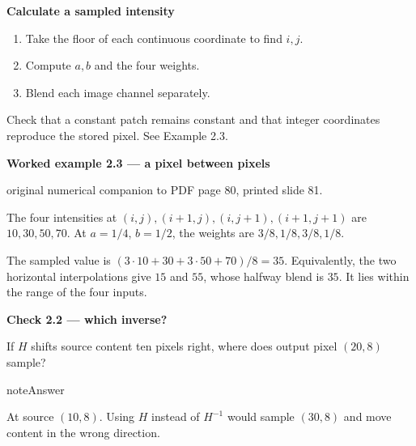 \documentclass[letterpaper,11pt,english,openany,oneside]{jupyterBook}
\begin{document}
\begin{TextbookBox}
\textbf{Calculate a sampled intensity}\par\smallskip
\begin{enumerate}
%
\item {}
\sphinxAtStartPar
Take the floor of each continuous coordinate to find \(i,j\).

\item {}
\sphinxAtStartPar
Compute \(a,b\) and the four weights.

\item {}
\sphinxAtStartPar
Blend each image channel separately.

\end{enumerate}

\sphinxAtStartPar
Check that a constant patch remains constant and that integer coordinates reproduce the stored pixel. See Example 2.3.

\end{TextbookBox}
\label{\detokenize{lectures/lecture02/warping:ex-lec02-bilinear}}
\begin{TextbookBox}
\textbf{Worked example 2.3 — a pixel between pixels}\par\smallskip

\sphinxAtStartPar
{} original numerical companion to PDF page 80, printed slide 81.

\sphinxAtStartPar
The four intensities at \((i,j),(i+1,j),(i,j+1),(i+1,j+1)\) are \(10,30,50,70\). At \(a=1/4\), \(b=1/2\), the weights are \(3/8,1/8,3/8,1/8\).

\sphinxAtStartPar
The sampled value is \((3\cdot10+30+3\cdot50+70)/8=35\). Equivalently, the two horizontal interpolations give \(15\) and \(55\), whose halfway blend is \(35\). It lies within the range of the four inputs.

\end{TextbookBox}

\begin{TextbookBox}
\textbf{Check 2.2 — which inverse?}\par\smallskip

\sphinxAtStartPar
If \(H\) shifts source content ten pixels right, where does output pixel \((20,8)\) sample?

\end{TextbookBox}

\begin{sphinxadmonition}{note}{Answer}

\sphinxAtStartPar
At source \((10,8)\). Using \(H\) instead of \(H^{-1}\) would sample \((30,8)\) and move content in the wrong direction.
\end{sphinxadmonition}
\end{document}
